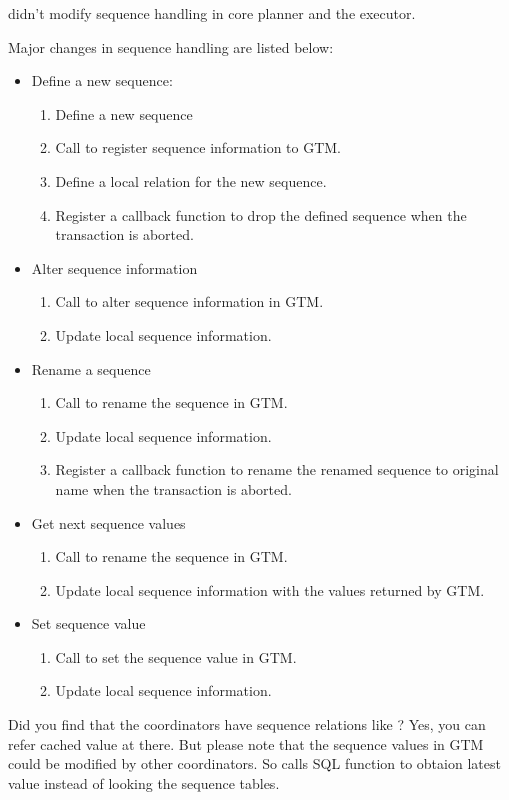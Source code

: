   \XC{} didn't modify sequence handling in core planner and the executor.

  Major changes in sequence handling are listed below:

  \begin{itemize}
  	\item Define a new sequence:
		\begin{enumerate}
			\item Define a new sequence
			\item Call  to register sequence information to GTM.
            \item Define a local relation for the new sequence.
            \item Register a callback function to drop the defined sequence when the transaction is aborted. 
		\end{enumerate}
	\item Alter sequence information
		\begin{enumerate}
			\item Call  to alter sequence information in GTM.
            \item Update local sequence information.
		\end{enumerate}
	\item Rename a sequence
		\begin{enumerate}
			\item Call  to rename the sequence in GTM.
            \item Update local sequence information.
            \item Register a callback function to rename the renamed sequence to original name when the transaction is aborted. 
		\end{enumerate}
	\item Get next sequence values
		\begin{enumerate}
			\item Call  to rename the sequence in GTM.
            \item Update local sequence information with the values returned by GTM.
		\end{enumerate}
	\item Set sequence value
		\begin{enumerate}
			\item Call  to set the sequence value in GTM. 
            \item Update local sequence information. 
		\end{enumerate}
  \end{itemize}
		
  Did you find that the coordinators have sequence relations like \PG?
  Yes, you can refer cached value at there.
  But please note that the sequence values in GTM could be modified by other coordinators.
  So  calls  SQL function to obtaion latest value
   instead of looking the sequence tables.

